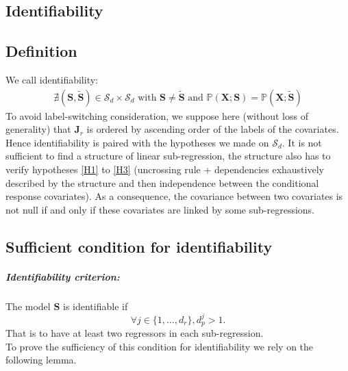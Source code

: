 \documentclass[12pt,a4paper]{report}
\begin{document}
\begin{appendices}
	\chapter{Identifiability}\label{sectionident}
		\section{Definition}
		We call identifiability:
\begin{eqnarray}
	\nexists (\boldsymbol{S},\tilde{\boldsymbol{S}}) \in \mathcal{S}_d\times \mathcal{S}_d \textrm{ with } \boldsymbol{S} \neq \tilde{\boldsymbol{S}} \textrm{ and }
	\mathbb{P}(\boldsymbol{X};\boldsymbol{S})=\mathbb{P}(\boldsymbol{X};\tilde{\boldsymbol{S}})
 \end{eqnarray}
 To avoid label-switching consideration, we suppose here (without loss of generality) that $\boldsymbol{J}_r$ is ordered by ascending order of the labels of the covariates.
	Hence identifiability is paired with the hypotheses we made on $ \mathcal{S}_d$. It is not sufficient to find a structure of linear sub-regression, the structure also has to verify hypotheses \ref{H1} to \ref{H3} (uncrossing rule + dependencies exhaustively described by the structure and then independence between the conditional response covariates). As a consequence, the covariance between two covariates is not null if and only if these covariates are linked by some sub-regressions.
 
		\section{Sufficient condition for identifiability}\label{suffcondident}

\paragraph{Identifiability criterion:} The model $\boldsymbol{S}$ is identifiable if
			\begin{equation}
				\forall j \in \{1,\dots,d_r\},  d_p^j>1\label{identcondition}.
			\end{equation}
That is to have at least two regressors in each sub-regression.\\

To prove the sufficiency of this condition for identifiability we rely on the following lemma.


\end{appendices}
\end{document}
